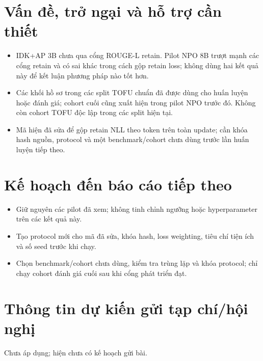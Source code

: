 \documentclass[11pt,a4paper]{article}
\newif\ifshowguide
\newcommand{\guide}[1]{\ifshowguide{\par\small\itshape\color{muted}#1\par\medskip}\fi}
\let\oldsection\section
\renewcommand{\section}{\needspace{6\baselineskip}\oldsection}
\begin{document}
\section{Vấn đề, trở ngại và hỗ trợ cần thiết}
\guide{Nêu nguồn lực hoặc hỗ trợ cần cho bước tiếp theo.}
\begin{itemize}
  \item IDK+AP 3B chưa qua cổng ROUGE-L retain. Pilot NPO 8B trượt mạnh các cổng retain và có sai khác trong cách gộp retain loss; không dùng hai kết quả này để kết luận phương pháp nào tốt hơn.
  \item Các khối hồ sơ trong các split TOFU chuẩn đã được dùng cho huấn luyện hoặc đánh giá; cohort cuối cũng xuất hiện trong pilot NPO trước đó. Không còn cohort TOFU độc lập trong các split hiện tại.
  \item Mã hiện đã sửa để gộp retain NLL theo token trên toàn update; cần khóa hash nguồn, protocol và một benchmark/cohort chưa dùng trước lần huấn luyện tiếp theo.
\end{itemize}

\section{Kế hoạch đến báo cáo tiếp theo}
\guide{Liệt kê các đầu ra cụ thể có thể kiểm tra ở báo cáo tiếp theo.}
\begin{itemize}[label=$\square$]
  \item Giữ nguyên các pilot đã xem; không tinh chỉnh ngưỡng hoặc hyperparameter trên các kết quả này.
  \item Tạo protocol mới cho mã đã sửa, khóa hash, loss weighting, tiêu chí tiện ích và số seed trước khi chạy.
  \item Chọn benchmark/cohort chưa dùng, kiểm tra trùng lặp và khóa protocol; chỉ chạy cohort đánh giá cuối sau khi cổng phát triển đạt.
\end{itemize}

\oldsection{Thông tin dự kiến gửi tạp chí/hội nghị}
\guide{Nếu chưa có kế hoạch gửi bài, ghi "Chưa áp dụng".}
Chưa áp dụng; hiện chưa có kế hoạch gửi bài.

\newcommand{\reviewerblock}[2]{%
  \needspace{8\baselineskip}%
  \begin{tabularx}{\textwidth}{|p{4cm}|X|}\hline
  \textbf{#2} & #1\\ \hline
  \textbf{Ngày nhận xét} & \\ \hline
  \textbf{Ý kiến} & \rule[-3.6cm]{0pt}{3.7cm}\\ \hline
  \end{tabularx}\par\medskip}
\end{document}
